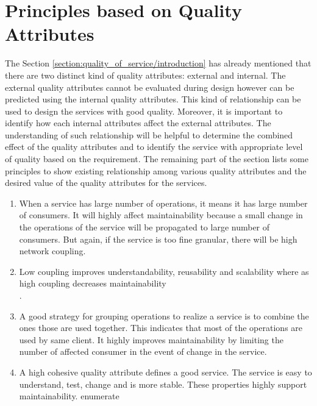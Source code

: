 {{{{{{{{%
\section{Principles based on Quality Attributes}{\label{section:quality_of_service/quality_attributes_principle}
The Section \ref{section:quality_of_service/introduction} has already mentioned that there are two distinct kind of quality attributes: external and internal. The external quality attributes cannot be evaluated during design however can be predicted using the internal quality attributes. This kind of relationship can be used to design the services with good quality. Moreover, it is important to identify how each internal attributes affect the external attributes. The understanding of such relationship will be helpful to determine the combined effect of the quality attributes and to identify the service with appropriate level of quality based on the requirement.
The remaining part of the section lists some principles to show existing relationship among various quality attributes and the desired value of the quality attributes for the services.
\begin{enumerate}
\item When a service has large number of operations, it means it has large number of consumers. It will highly affect maintainability because a small change in the operations of the service will be propagated to large number of consumers. But again, if the service is too fine granular, there will be high network coupling. \cite{Feuerlicht:2007aa, Xiao-jun:2015aa, Bianco:2007aa}

\item Low coupling improves understandability, reusability and scalability where as high coupling decreases maintainability
\\
\cite{Kazemi:2011aa, Erl:2005aa, Josuttis:2007aa}.

\item A good strategy for grouping operations to realize a service is to combine the ones those are used together.  This indicates that most of the operations are used by same client.  It highly improves maintainability by limiting the number of affected consumer in the event of change in the service. \cite{Xiao-jun:2015aa}

\item A high cohesive quality attribute defines a good service. The service is easy to understand, test, change and is more stable. These properties highly support maintainability. {enumerate}\cite{np:2001aa}


\end{enumerate}}}}}}}}}}

